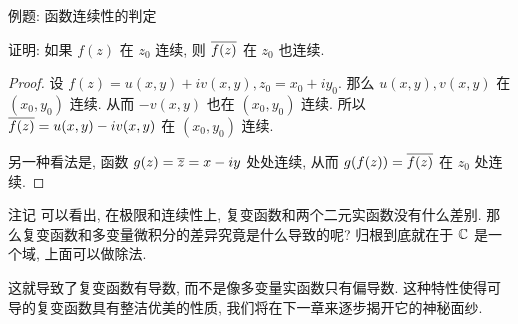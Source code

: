 \begin{frame}{例题: 函数连续性的判定}
\begin{example}
证明: 如果 $f(z)$ 在 $z_0$ 连续, 则 $\overline{f(z)}$ 在 $z_0$ 也连续.
\end{example}
\begin{proof}
\indent
设 $f(z)=u(x,y)+iv(x,y),z_0=x_0+iy_0$.
\onslide<+->
那么 $u(x,y),v(x,y)$ 在 $(x_0,y_0)$ 连续.
\onslide<+->
从而 $-v(x,y)$ 也在 $(x_0,y_0)$ 连续.
\onslide<+->
所以 $\overline{f(z)}=u(x,y)-iv(x,y)$ 在 $(x_0,y_0)$ 连续.

\indent
\onslide<+->
另一种看法是, 函数 $g(z)=\overline z=x-iy$ 处处连续,
\onslide<+->
从而 $g(f(z))=\overline{f(z)}$ 在 $z_0$ 处连续.
\end{proof}
\end{frame}


\begin{frame}{注记}
\onslide<+->
可以看出, 在极限和连续性上, 复变函数和两个二元实函数没有什么差别.
\onslide<+->
那么复变函数和多变量微积分的差异究竟是什么导致的呢?
\onslide<+->
归根到底就在于 ${\mathbb{C}}$ 是一个域, 上面可以做除法.

\onslide<+->
这就导致了复变函数有\alert{导数}, 而不是像多变量实函数只有偏导数.
\onslide<+->
这种特性使得可导的复变函数具有整洁优美的性质, 我们将在下一章来逐步揭开它的神秘面纱.
\end{frame}

